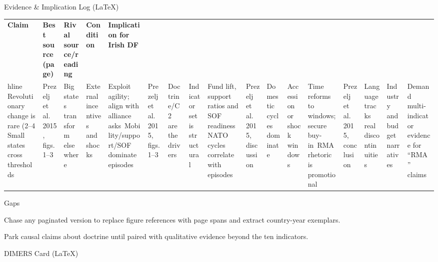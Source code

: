 Evidence & Implication Log (LaTeX)

\usepackage{array}
\begin{tabular}{p{3.2cm}p{4.2cm}p{3.6cm}p{3.2cm}p{4.2cm}}
	\textbf{Claim} & \textbf{Best source (page)} & \textbf{Rival source/reading} & \textbf{Condition} & \textbf{Implication for Irish DF}\\hline
	Revolutionary change is rare (2–4%
	Small states cross thresholds & Prezelj et al. 2015, figs. 1–3 & Big states transform elsewhere & External incentives and shocks & Exploit agility; align with alliance asks\
	Mobility/support/SOF dominate episodes & Prezelj et al. 2015, figs. 1–3 & Doctrine/C2 are the drivers & Indicator set is structural & Fund lift, support ratios and SOF readiness\
	NATO cycles correlate with episodes & Prezelj et al. 2015, discussion & Domestic cycles dominate & Accession or shock windows & Time reforms to windows; secure buy-in\
	RMA rhetoric is promotional & Prezelj et al. 2015, conclusion & Language tracks real discontinuities & Industry and budget narratives & Demand multi-indicator evidence for “RMA” claims\
\end{tabular}

Gaps

Chase any paginated version to replace figure references with page spans and extract country-year exemplars.

Park causal claims about doctrine until paired with qualitative evidence beyond the ten indicators.


\parencite{HUTTO_2025}

DIMERS Card (LaTeX)

